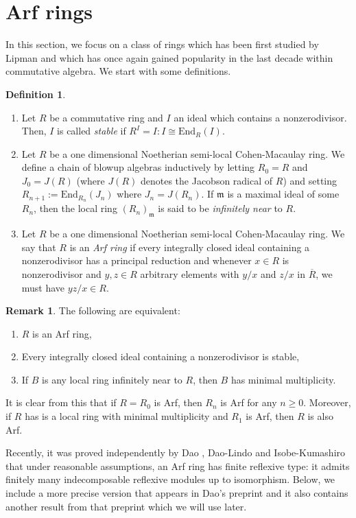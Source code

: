 \documentclass[12pt]{amsart}
\newcommand{\End}{\mathrm{End}}
\newcommand{\m}{\mathfrak{m}}
\theoremstyle{definition}
\newtheorem{definition}[theorem]{Definition}
\newtheorem{remark}[theorem]{Remark}
\begin{document}
\iffalse
\section{Arf rings}
In this section, we focus on a class of rings which has been first studied by Lipman \cite{Lipman} and which has once again gained popularity in the last decade within commutative algebra. We start with some definitions.

\begin{definition}
    \begin{enumerate}
        \item Let $R$ be a commutative ring and $I$ an ideal which contains a nonzerodivisor. Then, $I$ is called \textit{stable} if $R^I = I \colon I\cong \End_R(I)$.
        \item Let $R$ be a one dimensional Noetherian semi-local Cohen-Macaulay ring. We define a chain of blowup algebras inductively by letting $R_0 = R$ and $J_0 = J(R)$ (where $J(R)$ denotes the Jacobson radical of $R$) and setting $R_{n+1} := \End_{R_n}(J_n)$ where $J_n = J(R_n)$. If $\m$ is a maximal ideal of some $R_n$, then the local ring $(R_n)_\m$ is said to be \textit{infinitely near} to $R$.
        \item  Let $R$ be a one dimensional Noetherian semi-local Cohen-Macaulay ring. We say that $R$ is an \textit{Arf ring} if every integrally closed ideal containing a nonzerodivisor has a principal reduction and whenever $x \in R$ is nonzerodivisor and $y,z \in R$ arbitrary elements with $y/x$ and $z/x$ in $\overline{R}$, we must have $yz/x \in R$.
    \end{enumerate}
\end{definition}
\begin{remark}
    The following are equivalent:
\begin{enumerate}
    \item $R$ is an Arf ring,
    \item Every integrally closed ideal containing a nonzerodivisor is stable,
    \item If $B$ is any local ring infinitely near to $R$, then $B$ has minimal multiplicity.
\end{enumerate}
It is clear from this that if $R = R_0$ is Arf, then $R_n$ is Arf for any $n \geq 0$. Moreover, if $R$ has is a local ring with minimal multiplicity and $R_1$ is Arf, then $R$ is also Arf.
\end{remark}
Recently, it was proved independently by Dao \cite{Dao}, Dao-Lindo \cite{Dao-Lindo} and Isobe-Kumashiro \cite{Isobe-Kumashiro} that under reasonable assumptions, an Arf ring has finite reflexive type: it admits finitely many indecomposable reflexive modules up to isomorphism. Below, we include a more precise version that appears in Dao's preprint and it also contains another result from that preprint which we will use later.
\end{document}
